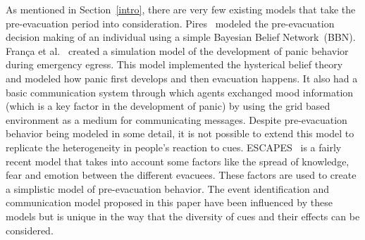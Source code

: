 As mentioned in Section~\ref{intro}, there are very few existing models that take the pre-evacuation period into consideration. Pires~\cite{Pires:2005gs}  modeled the pre-evacuation decision making of an individual using a simple Bayesian Belief Network~(BBN). Fran{\c c}a et al.~\cite{Franca:2009wq} created a simulation model of the development of panic behavior during emergency egress. This model implemented the hysterical belief theory~\cite{Torres:2010tj} and modeled how panic first develops and then evacuation happens. It also had a basic communication system through which agents exchanged mood information (which is a key factor in the development of panic) by using the grid based environment as a medium for communicating messages. Despite pre-evacuation behavior being modeled in some detail, it is not possible to extend this model to replicate the heterogeneity in people's reaction to cues. ESCAPES~\cite{Tsai:2011tz} is a fairly recent model that takes into account some factors like the spread of knowledge, fear and emotion between the different evacuees. These factors are used to create a simplistic model of pre-evacuation behavior. The event identification and communication model proposed in this paper have been influenced by these models but is unique in the way that the diversity of cues and their effects can be considered.





